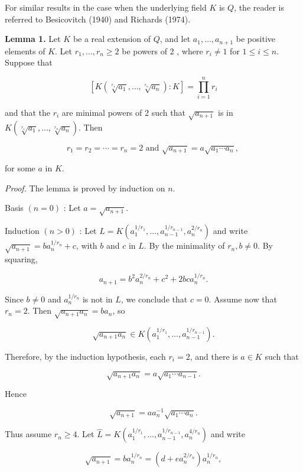 \documentclass[11pt,letterpaper]{article}
\begin{document}
For similar results in the case when the underlying field $K$ is $Q$, the reader is referred to Besicovitch (1940) and Richards (1974).

\noindent\textbf{Lemma 1.} Let $K$ be a real extension of $Q$, and let $a_{1}, \ldots, a_{n+1}$ be positive elements of $K$. Let $r_{1}, \ldots, r_{n} \geqslant 2$ be powers of 2 , where $r_{i} \neq 1$ for $1 \leqslant i \leqslant n$. Suppose that

\[
\left[K\left(\sqrt[r_{1}]{a_{1}}, \ldots, \sqrt[r_{n}]{a_{n}}\right): K\right]=\prod_{i=1}^{n} r_{i}
\]

and that the $r_{i}$ are minimal powers of 2 such that $\sqrt{a_{n+1}}$ is in $K\left(\sqrt[r_{1}]{a_{1}}, \ldots, \sqrt[r_{n}]{a_{n}}\right)$. Then

\[
r_{1}=r_{2}=\cdots=r_{n}=2 \text { and } \sqrt{a_{n+1}}=a \sqrt{a_{1} \cdots a_{n}} \text {, }
\]

for some $a$ in $K$.

\noindent\textit{Proof.} The lemma is proved by induction on $n$.

Basis $(n=0)$ : Let $a=\sqrt{a_{n+1}}$.

Induction $(n>0)$ : Let $L=K\left(a_{1}^{1 / r_{1}}, \ldots, a_{n-1}^{1/r_{n-1}}, a_{n}^{2 / r_{n}}\right)$ and write $\sqrt{a_{n+1}}=b a_{n}^{1 / r_{n}}+c$, with $b$ and $c$ in $L$. By the minimality of $r_{n}, b \neq 0$. By squaring,

\[
a_{n+1}=b^{2} a_{n}^{2 / r_{n}}+c^{2}+2 b c a_{n}^{1 / r_{n}} .
\]

Since $b \neq 0$ and $a_{n}^{1 / r_{n}}$ is not in $L$, we conclude that $c=0$. Assume now that $r_{n}=2$. Then $\sqrt{a_{n+1} a_{n}}=b a_{n}$, so

\[
\sqrt{a_{n+1} a_{n}} \in K\left(a_{1}^{1 / r_{1}}, \ldots, a_{n-1}^{1 / r_{n-1}}\right) .
\]

Therefore, by the induction hypothesis, each $r_{i}=2$, and there is $a \in K$ such that

\[
\sqrt{a_{n+1} a_{n}}=a \sqrt{a_{1} \cdots a_{n-1}} .
\]

Hence

\[
\sqrt{a_{n+1}}=a a_{n}^{-1} \sqrt{a_{1} \cdots a_{n}} .
\]

Thus assume $r_{n} \geqslant 4$. Let $\hat{L}=K\left(a_{1}^{1 / r_{1}}, \ldots, a_{n-1}^{1 / r_{n-1}}, a_{n}^{4 / r_{n}}\right)$ and write

\[
\sqrt{a_{n+1}}=b a_{n}^{1 / r_{n}}=\left(d+e a_{n}^{2 / r_{n}}\right) a_{n}^{1 / r_{n}},
\]
\end{document}
